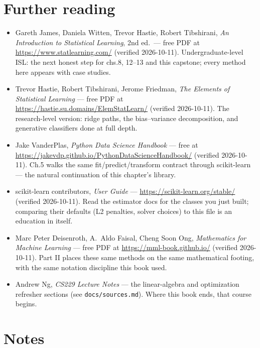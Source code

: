 \section*{Further reading}

\begin{itemize}
\item Gareth James, Daniela Witten, Trevor Hastie, Robert
Tibshirani, \emph{An Introduction to Statistical Learning}, 2nd
ed.\ --- free PDF at \url{https://www.statlearning.com/} (verified
2026-10-11). Undergraduate-level ISL: the next honest step for
chs.8, 12--13 and this capstone; every method here appears with
case studies.
\item Trevor Hastie, Robert Tibshirani, Jerome Friedman, \emph{The
Elements of Statistical Learning} --- free PDF at
\url{https://hastie.su.domains/ElemStatLearn/} (verified
2026-10-11). The research-level version: ridge paths, the
bias--variance decomposition, and generative classifiers done at
full depth.
\item Jake VanderPlas, \emph{Python Data Science Handbook} --- free
at \url{https://jakevdp.github.io/PythonDataScienceHandbook/}
(verified 2026-10-11). Ch.5 walks the same fit/predict/transform
contract through scikit-learn --- the natural continuation of this
chapter's library.
\item scikit-learn contributors, \emph{User Guide} ---
\url{https://scikit-learn.org/stable/} (verified 2026-10-11).
Read the estimator docs for the classes you just built; comparing
their defaults (L2 penalties, solver choices) to this file is an
education in itself.
\item Marc Peter Deisenroth, A.\ Aldo Faisal, Cheng Soon Ong,
\emph{Mathematics for Machine Learning} --- free PDF at
\url{https://mml-book.github.io/} (verified 2026-10-11). Part II
places these same methods on the same mathematical footing, with
the same notation discipline this book used.
\item Andrew Ng, \emph{CS229 Lecture Notes} --- the linear-algebra
and optimization refresher sections (see \texttt{docs/sources.md}).
Where this book ends, that course begins.
\end{itemize}

\section*{Notes}

